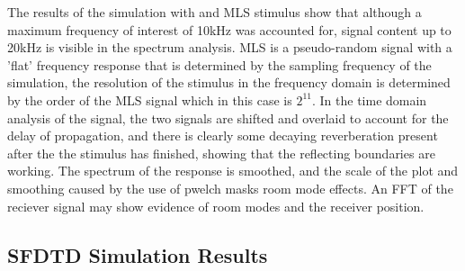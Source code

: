 The results of the simulation with and MLS stimulus show that although a maximum frequency of interest of 10kHz was accounted for, signal content up to 20kHz is visible in the spectrum analysis. MLS is a pseudo-random signal with a 'flat' frequency response that is determined by the sampling frequency of the simulation, the resolution of the stimulus in the frequency domain is determined by the order of the MLS signal which in this case is $2^{11}$. In the time domain analysis of the signal, the two signals are shifted and overlaid to account for the delay of propagation, and there is clearly some decaying reverberation present after the the stimulus has finished, showing that the reflecting boundaries are working. The spectrum of the response is smoothed, and the scale of the plot and smoothing caused by the use of pwelch masks room mode effects. An FFT of the reciever signal may show evidence of room modes and the receiver position.


\subsection{SFDTD Simulation Results}

